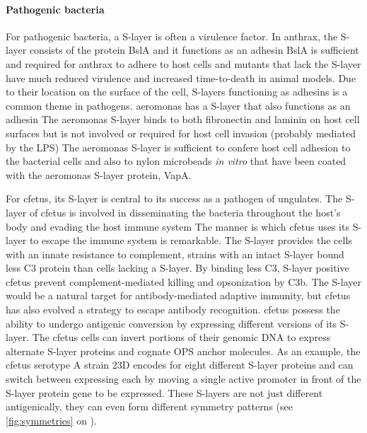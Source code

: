   \paragraph{Pathogenic bacteria} For pathogenic bacteria, a \ac{S-layer} is often a virulence factor. In \ac{anthrax}, the \ac{S-layer} consists of the protein BslA and it functions as an adhesin BslA is sufficient and required for \ac{anthrax} to adhere to host cells and mutants that lack the \ac{S-layer} have much reduced virulence and increased time-to-death in animal models. Due to their location on the surface of the cell, \acp{S-layer} functioning as adhesins is a common theme in pathogens. \ac{aeromonas} has a \ac{S-layer} that also functions as an adhesin The \ac{aeromonas} \ac{S-layer} binds to both fibronectin and laminin on host cell surfaces but is not involved or required for host cell invasion (probably mediated by the \ac{LPS})
  The \ac{aeromonas} \ac{S-layer} is sufficient to confere host cell adhesion to the bacterial cells and also to nylon microbeads \textit{in vitro} that have been coated with the \ac{aeromonas} \ac{S-layer} protein, VapA. 

  For \ac{cfetus}, its \ac{S-layer} is central to its success as a pathogen of ungulates. The \ac{S-layer} of \ac{cfetus} is involved in disseminating the bacteria throughout the host's body and evading the host immune system The manner is which \ac{cfetus} uses its \ac{S-layer} to escape the immune system is remarkable. The \ac{S-layer} provides the cells with an innate resistance to complement, strains with an intact \ac{S-layer} bound less C3 protein than cells lacking a \ac{S-layer}. By binding less C3, \ac{S-layer} positive \ac{cfetus} prevent complement-mediated killing and opsonization by C3b. The \ac{S-layer} would be a natural target for antibody-mediated adaptive immunity, but \ac{cfetus} has also evolved a strategy to escape antibody recognition. \ac{cfetus} possess the ability to undergo antigenic conversion by expressing different versions of its \ac{S-layer}. The \ac{cfetus} cells can invert portions of their genomic DNA to express alternate \ac{S-layer} proteins and cognate \ac{OPS} anchor molecules. As an example, the \ac{cfetus} serotype A strain 23D encodes for eight different \ac{S-layer} proteins and can switch between expressing each by moving a single active promoter in front of the \ac{S-layer} protein gene to be expressed. These \acp{S-layer} are not just different antigenically, they can even form different symmetry patterns (see \cref{fig:symmetries} on ).

